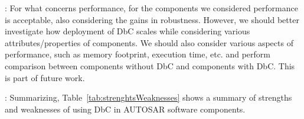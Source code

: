 : For what concerns performance, for the components we considered %
performance is acceptable, also considering the gains in robustness. However, we should better investigate how deployment of DbC scales while considering various attributes/properties of components. We should also consider various aspects of performance, such as %
memory footprint, execution time, etc. and perform comparison between components without DbC and components with DbC. This is part of future work. %

: Summarizing, Table~\ref{tab:strenghtsWeaknesses} shows a summary of strengths and weaknesses of using DbC in AUTOSAR software components. 